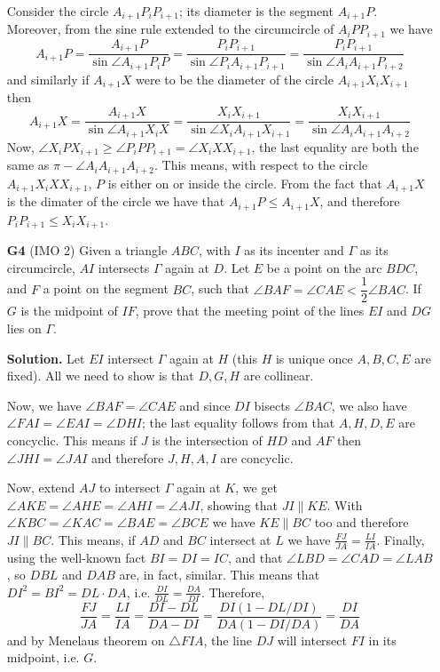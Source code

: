 \documentclass[11pt]{article}
\newcommand{\<}{\langle}
\renewcommand{\>}{\rangle}
\begin{document}
\begin{enumerate}
	Consider the circle $A_{i+1}P_iP_{i+1}$; its diameter is the segment $A_{i+1}P$. Moreover, from the sine rule extended to the circumcircle of $A_iPP_{i+1}$ we have 
	\[A_{i+1}P=\dfrac{A_{i+1}P}{\sin \angle A_{i+1}P_iP}=\dfrac{P_iP_{i+1}}{\sin\angle P_iA_{i+1}P_{i+1}}=\dfrac{P_iP_{i+1}}{\sin\angle A_iA_{i+1}P_{i+2}}\]
	and similarly if $A_{i+1}X$ were to be the diameter of the circle $A_{i+1}X_iX_{i+1}$ then 
	\[A_{i+1}X=\dfrac{A_{i+1}X}{\sin \angle A_{i+1}X_iX}=\dfrac{X_iX_{i+1}}{\sin\angle X_iA_{i+1}X_{i+1}}=\dfrac{X_iX_{i+1}}{\sin\angle A_iA_{i+1}A_{i+2}}\]
	Now,  $\angle X_iPX_{i+1} \ge \angle P_iPP_{i+1} = \angle X_iXX_{i+1}$, the last equality are both the same as $\pi - \angle A_iA_{i+1}A_{i+2}$. This means, with respect to the circle $A_{i+1}X_iXX_{i+1}$, $P$ is either on or inside the circle. From the fact that $A_{i+1}X$ is the dimater of the circle we have that $A_{i+1}P\le A_{i+1}X$, and therefore $P_iP_{i+1}\le X_iX_{i+1}$. 
	
	\item [\textbf{G4}] (IMO 2) Given a triangle $ABC$, with $I$ as its incenter and $\Gamma$ as its circumcircle, $AI$ intersects $\Gamma$ again at $D$. Let $E$ be a point on the arc $BDC$, and $F$ a point on the segment $BC$, such that $\angle BAF=\angle CAE < \dfrac12\angle BAC$. If $G$ is the midpoint of $IF$, prove that the meeting point of the lines $EI$ and $DG$ lies on $\Gamma$. 
	
	\textbf{Solution.} Let $EI$ intersect $\Gamma$ again at $H$ (this $H$ is unique once $A, B, C, E$ are fixed). All we need to show is that $D, G, H$ are collinear. 
	
	Now, we have $\angle BAF=\angle CAE$ and since $DI$ bisects $\angle BAC$, we also have $\angle FAI=\angle EAI=\angle DHI$; the last equality follows from that $A, H, D, E$ are concyclic. 
	This means if $J$ is the intersection of $HD$ and $AF$ then $\angle JHI=\angle JAI$ and therefore $J, H, A, I$ are concyclic. 
	
	Now, extend $AJ$ to intersect $\Gamma$ again at $K$, we get $\angle AKE=\angle AHE=\angle AHI=\angle AJI$, showing that $JI\parallel KE$. With $\angle KBC=\angle KAC=\angle BAE=\angle BCE$ we have $KE\parallel BC$ too and therefore $JI\parallel BC$. 
	This means, if $AD$ and $BC$ intersect at $L$ we have $\frac{FJ}{JA}=\frac{LI}{IA}$. 
	Finally, using the well-known fact $BI=DI=IC$, and that $\angle LBD=\angle CAD=\angle LAB$, so $DBL$ and $DAB$ are, in fact, similar. This means that $DI^2=BI^2=DL\cdot DA$, i.e. $\frac{DI}{DL}=\frac{DA}{DI}$. Therefore, 
	\[
	\frac{FJ}{JA}=\frac{LI}{IA}=\frac{DI-DL}{DA-DI}=\frac{DI(1-DL/DI)}{DA(1-DI/DA)}=\frac{DI}{DA}
	\]
	and by Menelaus theorem on $\triangle FIA$, the line $DJ$ will intersect $FI$ in its midpoint, i.e. $G$. 
	

\end{enumerate}
\end{document}
